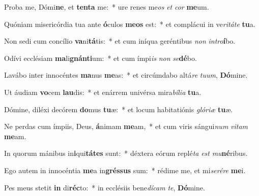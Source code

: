 \item Proba me, Dómi\textbf{ne}, et \textbf{ten}\textbf{ta} me:~* ure renes me\textit{os} \textit{et} \textit{cor} \textbf{me}um.
\item Quóniam misericórdia tua ante \textbf{ó}culos \textbf{me}\textbf{os} est:~* et complácui in ve\textit{ri}\textit{tá}\textit{te} \textbf{tu}a.
\item Non sedi cum concílio \textbf{va}ni\textbf{tá}tis:~* et cum iníqua geréntibus \textit{non} \textit{in}\textit{tro}\textbf{í}bo.
\item Odívi ecclésiam \textbf{ma}li\textbf{gnán}\textbf{ti}um:~* et cum ímpi\textit{is} \textit{non} \textit{se}\textbf{dé}bo.
\item Lavábo inter innocéntes \textbf{ma}nus \textbf{me}as:~* et circúmdabo altá\textit{re} \textit{tu}\textit{um}, \textbf{Dó}mine.
\item Ut áudiam \textbf{vo}cem \textbf{lau}dis:~* et enárrem univérsa mira\textit{bí}\textit{li}\textit{a} \textbf{tu}a.
\item Dómine, diléxi decórem \textbf{do}mus \textbf{tu}æ:~* et locum habitatiónis \textit{gló}\textit{ri}\textit{æ} \textbf{tu}æ.
\item Ne perdas cum ímpiis, Deus, \textbf{á}nimam \textbf{me}am,~* et cum viris sángui\textit{num} \textit{vi}\textit{tam} \textbf{me}am.
\item In quorum mánibus in\textbf{i}qui\textbf{tá}\textbf{tes} sunt:~* déxtera eórum replé\textit{ta} \textit{est} \textit{mu}\textbf{né}ribus.
\item Ego autem in innocéntia \textbf{me}a in\textbf{grés}\textbf{sus} sum:~* rédime me, et mi\textit{se}\textit{ré}\textit{re} \textbf{me}i.
\item Pes meus stetit \textbf{in} di\textbf{réc}to:~* in ecclésiis bene\textit{dí}\textit{cam} \textit{te}, \textbf{Dó}mine.
